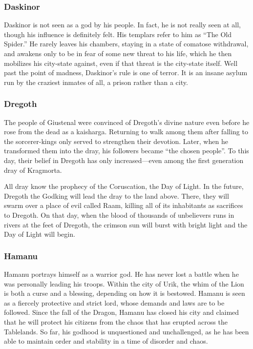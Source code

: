 \subsubsection{Daskinor}
Daskinor is not seen as a god by his people. In fact, he is not really seen at all, though his influence is definitely felt. His templars refer to him as ``The Old Spider.'' He rarely leaves his chambers, staying in a state of comatose withdrawal, and awakens only to be in fear of some new threat to his life, which he then mobilizes his city-state against, even if that threat is the city-state itself. Well past the point of madness, Daskinor's rule is one of terror. It is an insane asylum run by the craziest inmates of all, a prison rather than a city.

\subsubsection{Dregoth}
The people of Giustenal were convinced of Dregoth's divine nature even before he rose from the dead as a kaisharga. Returning to walk among them after falling to the sorcerer-kings only served to strengthen their devotion. Later, when he transformed them into the dray, his followers became ``the chosen people''. To this day, their belief in Dregoth has only increased---even among the first generation dray of Kragmorta.

All dray know the prophecy of the Coruscation, the Day of Light. In the future, Dregoth the Godking will lead the dray to the land above. There, they will swarm over a place of evil called Raam, killing all of its inhabitants as sacrifices to Dregoth. On that day, when the blood of thousands of unbelievers runs in rivers at the feet of Dregoth, the crimson sun will burst with bright light and the Day of Light will begin.

\subsubsection{Hamanu}
Hamanu portrays himself as a warrior god. He has never lost a battle when he was personally leading his troops. Within the city of Urik, the whim of the Lion is both a curse and a blessing, depending on how it is bestowed. Hamanu is seen as a fiercely protective and strict lord, whose demands and laws are to be followed. Since the fall of the Dragon, Hamanu has closed his city and claimed that he will protect his citizens from the chaos that has erupted across the Tablelands. So far, his godhood is unquestioned and unchallenged, as he has been able to maintain order and stability in a time of disorder and chaos.

